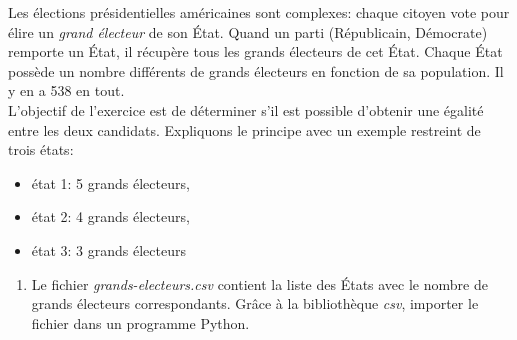 \documentclass[a4paper,11pt]{article}
\begin{document}
\begin{Form}
\begin{exo}
Les élections présidentielles américaines sont complexes: chaque citoyen vote pour élire un \emph{grand électeur} de son État. Quand un parti (Républicain, Démocrate) remporte un État, il récupère tous les grands électeurs de cet État. Chaque État possède un nombre différents de grands électeurs en fonction de sa population. Il y en a 538 en tout.\\
L'objectif de l'exercice est de déterminer s'il est possible d'obtenir une égalité entre les deux candidats. Expliquons le principe avec un exemple restreint de trois états:
\begin{itemize}
\item état 1: 5 grands électeurs,
\item état 2: 4 grands électeurs,
\item état 3: 3 grands électeurs
\end{itemize}
\begin{enumerate}
\item Le fichier \emph{grands-electeurs.csv} contient la liste des États avec le nombre de grands électeurs correspondants. Grâce à la bibliothèque \emph{csv}, importer le fichier dans un programme Python.
\end{enumerate}
\end{exo}
\end{Form}
\end{document}
